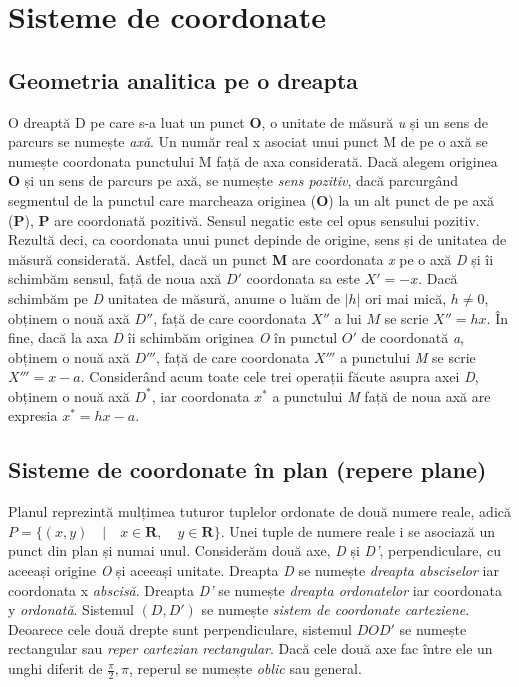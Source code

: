 \section{Sisteme de coordonate}
\label{ch1:sec_coord_sys}

\subsection{Geometria analitica pe o dreapta}
\label{ch1:sec_coord_sys:geometrie_dreapta}
\indent

O dreaptă D pe care s-a luat un punct \textbf{O}, o unitate de măsură \textit{u}
și un sens de parcurs se numește \emph{axă}. Un număr real x asociat unui punct 
M de pe o axă se numește coordonata punctului M față de axa considerată. Dacă
alegem originea \textbf{O} și un sens de parcurs pe axă, se numește \textit{sens
pozitiv}, dacă parcurgând segmentul de la punctul care marcheaza originea
(\textbf{O}) la un alt punct de pe axă (\textbf{P}), \textbf{P} are coordonată
pozitivă. Sensul negatic este cel opus sensului pozitiv. Rezultă deci, ca
coordonata unui punct depinde de origine, sens și de unitatea de măsură
considerată.
Astfel, dacă un punct \textbf{M} are coordonata \textit{x} pe o axă
\textit{D} și îi schimbăm sensul, față de noua axă $\mathit{D'}$ coordonata sa
este $\mathit{X' = -x}$. Dacă schimbăm pe \textit{D} unitatea de măsură, anume o
luăm de $\mathit{|h|}$ ori mai mică, $\mathit{h \neq 0}$, obținem o nouă axă
$\mathit{D''}$, față de care coordonata $\mathit{X''}$ a lui $\mathit{M}$
se scrie $\mathit{X'' = hx}$. În fine, dacă la axa \textit{D} îi schimbăm
originea \textit{O} în punctul $\mathit{O'}$ de coordonată \textit{a}, obținem o
nouă axă $\mathit{D'''}$, față de care coordonata $\mathit{X'''}$ a punctului
\textit{M} se scrie $\mathit{X''' = x - a}$. Considerând acum toate cele trei
operații făcute asupra axei \textit{D}, obținem o nouă axă $\mathit{D^*}$, iar
coordonata $\mathit{x^*}$ a punctului \textit{M} față de noua axă are expresia
$\mathit{x^* = hx - a}$.

\subsection{Sisteme de coordonate în plan (repere plane)}
\label{ch1:sec_coord_sys:cartesian_plane}
\indent

Planul reprezintă mulțimea tuturor tuplelor ordonate de două numere reale, adică
$P = \lbrace (x, y) \quad \vert \quad x \in \mathbf{R}, \quad y \in \mathbf{R}
\rbrace $. Unei tuple de numere reale i se asociază un punct din plan și numai
unul. Considerăm două axe, \textit{D} și \textit{D'}, perpendiculare, cu aceeași
origine \textit{O} și aceeași unitate. Dreapta \textit{D} se numește
\textit{dreapta absciselor} iar coordonata x \textit{abscisă}. Dreapta
\textit{D'} se numește \textit{dreapta ordonatelor} iar coordonata y
\textit{ordonată}. Sistemul $(D, D')$ se numește \textit{sistem de coordonate
carteziene}. Deoarece cele două drepte sunt perpendiculare, sistemul
$\mathit{DOD'}$ se numește rectangular sau \textit{reper cartezian rectangular}.
Dacă cele două axe fac  între ele un unghi diferit de $\frac{\pi}{2}, \pi$,
reperul se numește \textit{oblic} sau general. 

